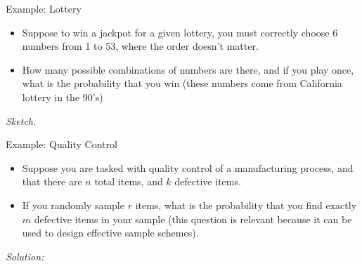 \begin{frame}[allowframebreaks]{Example: Lottery}

\begin{itemize}
  \item Suppose to win a jackpot for a given lottery, you must correctly choose 6 numbers from 1 to 53, where the order doesn't matter. 
  \item How many possible combinations of numbers are there, and if you play once, what is the probability that you win (these numbers come from California lottery in the 90's)
  
\end{itemize}

\emph{Sketch.}

\end{frame}

\begin{frame}{Example: Quality Control}
\begin{itemize}
  \item Suppose you are tasked with quality control of a manufacturing process, and that there are $n$ total items, and $k$ defective items. 
  \item If you randomly sample $r$ items, what is the probability that you find exactly $m$ defective items in your sample (this question is relevant because it can be used to design effective sample schemes).
\end{itemize}
  
  \emph{Solution:}
  
  
  
\end{frame}

